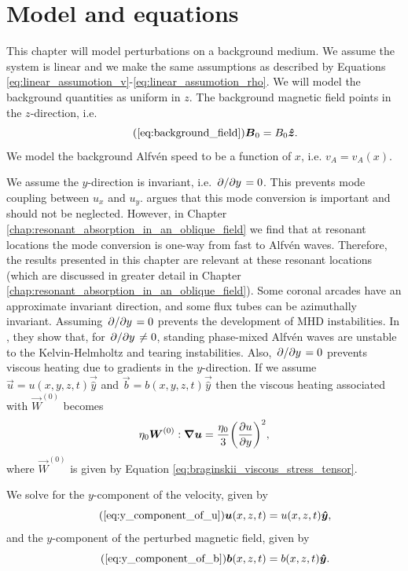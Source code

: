 \section{Model and equations}

This chapter will model perturbations on a background medium. We assume the system is linear and we make the same assumptions as described by Equations \eqref{eq:linear_assumotion_v}-\eqref{eq:linear_assumotion_rho}. We will model the background quantities as uniform in $z$. The background magnetic field points in the $z$-direction, i.e.
\begin{equation}
    \tag{\ref{eq:background_field}}
    \vec{B}_0 = B_0\vec{\hat{z}}.
\end{equation}
We model the background Alfv\'en speed to be a function of $x$, i.e. $v_A=v_A(x)$.

We assume the $y$-direction is invariant, i.e. $\pdv*{}{y}=0$. This prevents mode coupling between $u_x$ and $u_y$. \citet{Parker1991} argues that this mode conversion is important and should not be neglected. However, in Chapter \ref{chap:resonant_absorption_in_an_oblique_field} we find that at resonant locations the mode conversion is one-way from fast to Alfv\'en waves. Therefore, the results presented in this chapter are relevant at these resonant locations (which are discussed in greater detail in Chapter \ref{chap:resonant_absorption_in_an_oblique_field}). Some coronal arcades have an approximate invariant direction, and some flux tubes can be azimuthally invariant. Assuming $\pdv*{}{y}=0$ prevents the development of MHD instabilities. In \citet{Heyvaerts1983}, they show that, for $\pdv*{}{y}\ne0$, standing phase-mixed Alfv\'en waves are unstable to the Kelvin-Helmholtz and tearing instabilities. Also, $\pdv*{}{y}=0$ prevents viscous heating due to gradients in the $y$-direction. If we assume $\vec{u}=u(x,y,z,t)\vec{\hat{y}}$ and $\vec{b}=b(x,y,z,t)\vec{\hat{y}}$ then the viscous heating associated with $\vec{W}^{(0)}$ becomes
\begin{equation}
    \eta_0 \boldsymbol{W}^{(0)}:\grad{\boldsymbol{u}} = \frac{\eta_0}{3}\qty(\pdv{u}{y})^2,
\end{equation}
where $\vec{W}^{(0)}$ is given by Equation \eqref{eq:braginskii_viscous_stress_tensor}.

We solve for the $y$-component of the velocity, given by
\begin{equation}
    \tag{\ref{eq:y_component_of_u}}
    \vec{u}(x,z,t) = u(x,z,t)\vec{\hat{y}},
\end{equation}
and the $y$-component of the perturbed magnetic field, given by
\begin{equation}
    \tag{\ref{eq:y_component_of_b}}
    \vec{b}(x,z,t) = b(x,z,t)\vec{\hat{y}}.
\end{equation}

